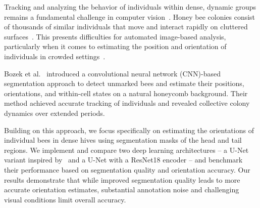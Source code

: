 Tracking and analyzing the behavior of individuals within dense, dynamic groups remains a fundamental challenge in computer vision~\cite{bozek2021markerless, bozek2018pixel}.
Honey bee colonies consist of thousands of similar individuals that move and interact rapidly on cluttered surfaces~\cite{bozek2021markerless}.
This presents difficulties for automated image-based analysis, particularly when it comes to estimating the position and orientation of individuals in crowded settings~\cite{bozek2018pixel, bozek2021markerless}.

Bozek et al.~\cite{bozek2021markerless} introduced a convolutional neural network (CNN)-based segmentation approach to detect unmarked bees and estimate their positions, orientations, and within-cell states on a natural honeycomb background. Their method achieved accurate tracking of individuals and revealed collective colony dynamics over extended periods.

Building on this approach, we focus specifically on estimating the orientations of individual bees in dense hives using segmentation masks of the head and tail regions.
We implement and compare two deep learning architectures -- a U-Net variant inspired by~\cite{bozek2021markerless} and a U-Net with a ResNet18 encoder -- and benchmark their performance based on segmentation quality and orientation accuracy.
Our results demonstrate that while improved segmentation quality leads to more accurate orientation estimates, substantial annotation noise and challenging visual conditions limit overall accuracy.
